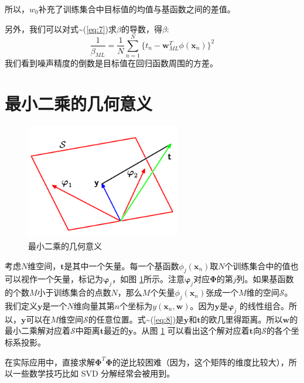 \documentclass[10pt,a4paper,UTF8]{article}
\begin{document}
所以，\(w_{0}\)补充了训练集合中目标值的均值与基函数之间的差值。

另外，我们可以对式\textasciitilde{}(\ref{eq:7})求\(\beta\)的导数，得\(\beta\):
\begin{equation}
\label{eq:16}
\frac{1}{\beta_{ML}} = \frac{1}{N}\sum_{n=1}^{N}\{t_{n}-\mathbf{w}_{ML}^{T}\phi(\mathbf{x}_{n})\}^{2}
\end{equation}
我们看到噪声精度的倒数是目标值在回归函数周围的方差。
\section{最小二乘的几何意义}
\label{sec:org3013812}


\begin{figure}[htbp]
\centering
\includegraphics[width=0.6\textwidth]{../../img/computer_prml/20170806leastSquare.png}
\caption{\label{fig:orge1902c6}
最小二乘的几何意义}
\end{figure}

考虑\(N\)维空间，\(\mathbf{t}\)是其中一个矢量。每一个基函数\(\phi_{j}(\mathbf{x}_{n})\)取\(N\)个训练集合中的值也可以视作一个矢量，标记为\(\mathbf{\varphi}_{j}\)，如图 \ref{fig:orge1902c6}所示。注意\(\mathbf{\varphi}_{j}\)对应\(\mathbf{\Phi}\)的第\(j\)列。如果基函数的个数\(M\)小于训练集合的点数\(N\)，那么\(M\)个矢量\(\phi_{j}(\mathbf{x}_{n})\)张成一个\(M\)维的空间\(\mathcal{S}\)。我们定义\(\mathbf{y}\)是一个\(N\)维向量其第\(n\)个坐标为\(y(\mathbf{x}_{n},\mathbf{w})\)。因为\(\mathbf{y}\)是\(\mathbf{\varphi}_{j}\) 的线性组合。所以，\(\mathbf{y}\)可以在\(M\)维空间\(\mathcal{S}\)的任意位置。式\textasciitilde{}(\ref{eq:8})是\(\mathbf{y}\)和\(\mathbf{t}\)的欧几里得距离。所以\(\mathbf{w}\)的最小二乘解对应着\(\mathcal{S}\)中距离\(\mathbf{t}\)最近的\(\mathbf{y}\)。从图 \ref{fig:orge1902c6} 可以看出这个解对应着\(\mathbf{t}\)向\(\mathcal{S}\)的各个坐标系投影。

在实际应用中，直接求解\(\mathbf{\Phi}^{T}\mathbf{\Phi}\)的逆比较困难（因为，这个矩阵的维度比较大），所以一些数学技巧比如 SVD 分解经常会被用到。
\end{document}
